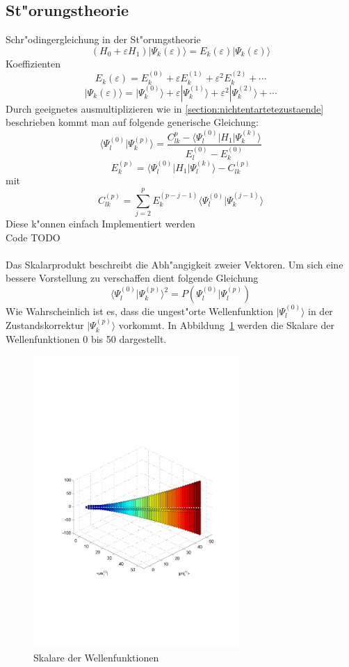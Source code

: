 \begin{refsection}
\section{St"orungstheorie}
Schr"odingergleichung in der St"orungstheorie
\[
(H_0+\varepsilon H_1)|\Psi_k(\varepsilon)\rangle
=
E_k(\varepsilon)|\Psi_k(\varepsilon)\rangle
\]
Koeffizienten
\[
E_k(\varepsilon)
=
E_k^{(0)}+\varepsilon E_k^{(1)}+\varepsilon^2 E_k^{(2)}+\dotsb
\]
\[
|\Psi_k(\varepsilon)\rangle
=
|\Psi_k^{(0)}\rangle+\varepsilon|\Psi_k^{(1)}\rangle+
\varepsilon^2|\Psi_k^{(2)}\rangle+\dotsb
\]
Durch geeignetes ausmultiplizieren wie in \ref{section:nichtentartetezustaende}  beschrieben kommt man auf folgende generische Gleichung:
\[
\langle\Psi_l^{(0)}|\Psi_k^{(p)}\rangle
=
\frac{C_{lk}^{p}-\langle\Psi_l^{(0)}|H_1|\Psi_k^{(k)}\rangle}
{E_l^{(0)}-E_k^{(0)}}
\]
\[
E_k^{(p)}
=
\langle\Psi_l^{(0)}|H_1|\Psi_l^{(k)}\rangle-C_{lk}^{(p)}
\]
mit
\[
C_{lk}^{(p)}
=
\displaystyle\sum_{j=2}^{p} E_k^{(p-j-1)}
\langle\Psi_l^{(0)}|\Psi_k^{(j-1)}\rangle
\]
Diese k"onnen einfach Implementiert werden\\
Code TODO\\
\\
Das Skalarprodukt beschreibt die Abh"angigkeit zweier Vektoren. Um sich eine bessere Vorstellung zu verschaffen dient folgende Gleichung
\[
\langle\Psi_l^{(0)}|\Psi_k^{(p)}\rangle^2
=
P(\Psi_l^{(0)}|\Psi_l^{(p)})
\]
Wie Wahrscheinlich ist es, dass die ungest"orte Wellenfunktion $|\Psi_l^{(0)}\rangle$ in der Zustandskorrektur $|\Psi_k^{(p)}\rangle$ vorkommt. In Abbildung~\ref{skript:PLK12} werden die Skalare der Wellenfunktionen 0 bis 50 dargestellt.

\begin{figure}[h]	%
\centering
\includegraphics[width=0.7\textwidth]{anharmonisch/images/x3/PLK12.pdf}
\caption{Skalare der Wellenfunktionen
\label{skript:PLK12}}
\end{figure}


\end{refsection}

